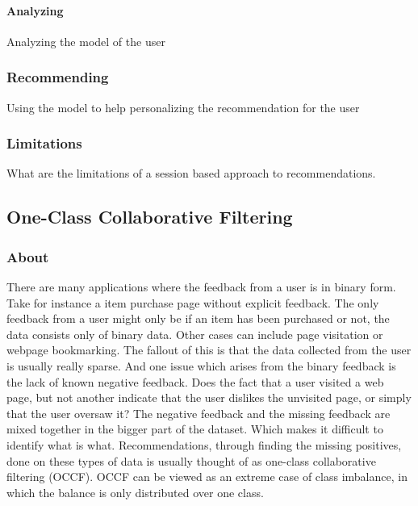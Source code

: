 
\paragraph{Analyzing}
    Analyzing the model of the user

\subsubsection{Recommending}
    Using the model to help personalizing the recommendation for the user

\subsubsection{Limitations}
    What are the limitations of a session based approach to recommendations.



\subsection{One-Class Collaborative Filtering}

\subsubsection{About}
There are many applications where the feedback from a user is in binary form.
Take for instance a item purchase page without explicit feedback.  The only
feedback from a user might only be if an item has been purchased or not, the
data consists only of binary data.  Other cases can include page visitation or
webpage bookmarking.  The fallout of this is that the data collected from the
user is usually really sparse.  And one issue which arises from the binary
feedback is the lack of known negative feedback.  Does the fact that a user
visited a web page, but not another indicate that the user dislikes the
unvisited page, or simply that the user oversaw it?  The negative feedback and
the missing feedback are mixed together in the bigger part of the dataset.
Which makes it difficult to identify what is what.  Recommendations, through
finding the missing positives, done on these types of data is usually thought
of as one-class collaborative filtering (OCCF).  OCCF can be viewed as an
extreme case of class imbalance, in which the balance is only distributed over
one class. 


